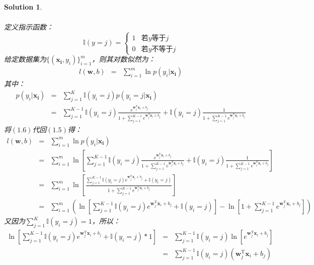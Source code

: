 \documentclass[a4paper,UTF8]{article}
\numberwithin{equation}{section}
\newtheorem*{solution}{Solution}
\begin{document}
\begin{solution}
\begin{enumerate}
\begin{eqnarray}
		\end{eqnarray}
		定义指示函数：
		$$\mathbb{I}(y=j)=
		\begin{cases}
		1& \text{若$y$等于$j$}\\
		0& \text{若$y$不等于$j$}
		\end{cases}$$
		给定数据集为$\{(\mathbf{x_i}, y_i)\}_{i=1}^m$，则其对数似然为：
		\begin{eqnarray}
			l(\mathbf{w}, b) &=& \sum_{i=1}^m\ln p(y_i|\mathbf{x_i})
		\end{eqnarray}
		其中：
		\begin{eqnarray}
			p(y_i|\mathbf{x_i})&=&\sum_{j=1}^K\mathbb{I}(y_i=j)p(y_i=j|\mathbf{x_i})\\
			&=&\sum_{j=1}^{K-1}\mathbb{I}(y_i = j)\frac{e^{\mathbf{w}_j^\mathrm{T}\mathbf{x}_i+b_j}}{1+\sum_{j=1}^{K-1}e^{\mathbf{w}_j^\mathrm{T}\mathbf{x}_i+b_j}}+\mathbb{I}(y_i = j)\frac{1}{1+\sum_{j=1}^{K-1}e^{\mathbf{w}_j^\mathrm{T}\mathbf{x}_i+b_j}}\nonumber
		\end{eqnarray}
		将$(1.6)$代回$(1.5)$得：
		\begin{eqnarray}
			l(\mathbf{w}, b) &=& \sum_{i=1}^m\ln p(y_i|\mathbf{x_i})\\
			&=&\sum_{i=1}^m\ln[\sum_{j=1}^{K-1}\mathbb{I}(y_i=j)\frac{e^{\mathbf{w}_j^\mathrm{T}\mathbf{x}_i+b_j}}{1+\sum_{j=1}^{K-1}e^{\mathbf{w}_j^\mathrm{T}\mathbf{x}_i+b_j}}+\mathbb{I}(y_i=j)\frac{1}{1+\sum_{j=1}^{K-1}e^{\mathbf{w}_j^\mathrm{T}\mathbf{x}_i+b_j}}]\nonumber\\
			&=&\sum_{i=1}^m\ln[\frac{\sum_{j=1}^{K-1}\mathbb{I}(y_i=j)e^{\mathbf{w}_j^\mathrm{T}\mathbf{x}_i+b_j}+\mathbb{I}(y_i=j)}{1+\sum_{j=1}^{K-1}e^{\mathbf{w}_j^\mathrm{T}\mathbf{x}_i+b_j}}]\nonumber\\
			&=&\sum_{i=1}^m(\ln[\sum_{j=1}^{K-1}\mathbb{I}(y_i=j)e^{\mathbf{w}_j^\mathrm{T}\mathbf{x}_i+b_j}+\mathbb{I}(y_i=j)]-\ln[1+\sum_{j=1}^{K-1}e^{\mathbf{w}_j^\mathrm{T}\mathbf{x}_i+b_j}])\nonumber
		\end{eqnarray}
		又因为$\sum_{j=1}^K\mathbb{I}(y_i=j)=1$，所以：
		\begin{eqnarray}
			\ln[\sum_{j=1}^{K-1}\mathbb{I}(y_i=j)e^{\mathbf{w}_j^\mathrm{T}\mathbf{x}_i+b_j}+\mathbb{I}(y_i=j)*1]&=&\sum_{j=1}^{K-1}\mathbb{I}(y_i=j)\ln[e^{\mathbf{w}_j^\mathrm{T}\mathbf{x}_i+b_j}]\\
			&=&\sum_{j=1}^{K-1}\mathbb{I}(y_i=j)(\mathbf{w}_j^\mathrm{T}\mathbf{x}_i+b_j)\nonumber
		\end{eqnarray}

\end{enumerate}
\end{solution}
\end{document}
